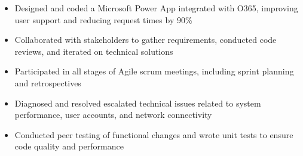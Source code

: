 \par\smallskip
\noindent
\begin{minipage}{20cm}
  \begin{minipage}{9.75cm}
    \begin{itemize}
      \item Designed and coded a Microsoft Power App integrated with O365, improving user support and reducing request times by 90\%
      \item Collaborated with stakeholders to gather requirements, conducted code reviews, and iterated on technical solutions
      \item Participated in all stages of Agile scrum meetings, including sprint planning and retrospectives
    \end{itemize}
  \end{minipage}
  \hfill
  \begin{minipage}{9.75cm}
    \begin{itemize}
      \item Diagnosed and resolved escalated technical issues related to system performance, user accounts, and network connectivity
      \item Conducted peer testing of functional changes and wrote unit tests to ensure code quality and performance
    \end{itemize}
  \end{minipage}
\end{minipage}
\par\smallskip
\divider

